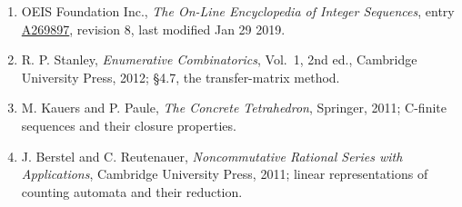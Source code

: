 \documentclass[11pt]{article}
\theoremstyle{definition}
\begin{document}
\begin{enumerate}

\item OEIS Foundation Inc., \emph{The On-Line Encyclopedia of Integer Sequences}, entry \href{https://oeis.org/A269897}{A269897}, revision 8, last modified Jan 29 2019.

\item R. P. Stanley, \emph{Enumerative Combinatorics}, Vol.~1, 2nd ed., Cambridge University Press, 2012; \S4.7, the transfer-matrix method.

\item M. Kauers and P. Paule, \emph{The Concrete Tetrahedron}, Springer, 2011; C-finite sequences and their closure properties.

\item J. Berstel and C. Reutenauer, \emph{Noncommutative Rational Series with Applications}, Cambridge University Press, 2011; linear representations of counting automata and their reduction.

\end{enumerate}
\end{document}
